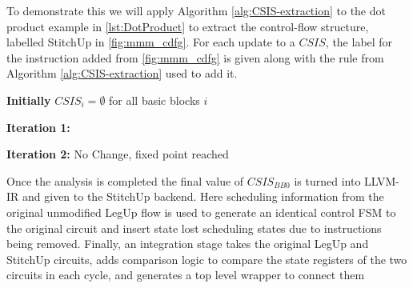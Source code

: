 To demonstrate this we will apply Algorithm \ref{alg:CSIS-extraction} to the
dot product example in \ref{lst:DotProduct} to extract the control-flow structure, 
labelled StitchUp in \ref{fig:mmm_cdfg}. 
For each update to a $CSIS$, the label for the instruction added from \ref{fig:mmm_cdfg} is given 
along with the rule from Algorithm \ref{alg:CSIS-extraction} used to add it. 

\vspace{1mm}
\noindent
\textbf{Initially} $CSIS_{i} = \emptyset$ for all basic blocks $i$

\vspace{-2mm}
\noindent
\hrulefill

\vspace{-1mm}
\noindent
\textbf{Iteration 1:}


\vspace{1mm}
\noindent
\textbf{Iteration 2:}\hspace{3mm} No Change, fixed point reached

\vspace{1mm}

Once the analysis is completed the final value of $CSIS_{BB0}$ is turned into LLVM-IR
and given to the StitchUp backend.
Here scheduling information from the original unmodified LegUp flow is used to generate
an identical control FSM to the original circuit and insert state lost scheduling states
due to instructions being removed. 
Finally, an integration stage takes the original LegUp and StitchUp circuits,
adds comparison logic to compare the state registers of the two circuits in each cycle,
and generates a top level wrapper to connect them

